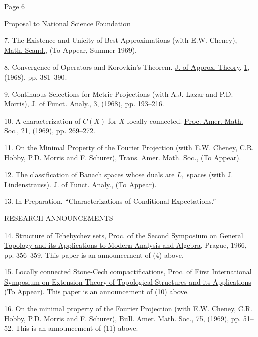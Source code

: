 Page 6

Proposal to National Science Foundation

7. The Existence and Unicity of Best Approximations (with E.W. Cheney),
\uline{Math. Scand.}, (To Appear, Summer 1969).

8. Convergence of Operators and Korovkin’s Theorem.
\uline{J. of Approx. Theory}, \uline{1}, (1968), pp. 381--390.

9. Continuous Selections for Metric Projections (with A.J. Lazar and P.D. Morris),
\uline{J. of Funct. Analy.}, \uline{3}, (1968), pp. 193--216.

10. A characterization of $C(X)$ for $X$ locally connected.
\uline{Proc. Amer. Math. Soc.}, \uline{21}, (1969), pp. 269--272.

11. On the Minimal Property of the Fourier Projection
(with E.W. Cheney, C.R. Hobby, P.D. Morris and F. Schurer),
\uline{Trans. Amer. Math. Soc.}, (To Appear).

12. The classification of Banach spaces whose duals are $L_1$ spaces
(with J. Lindenstrauss). \uline{J. of Funct. Analy.}, (To Appear).

13. In Preparation. ``Characterizations of Conditional Expectations.''

RESEARCH ANNOUNCEMENTS

14. Structure of Tchebychev sets,
\uline{Proc. of the Second Symposium on General Topology and its Applications to Modern Analysis and Algebra},
Prague, 1966, pp. 356--359. This paper is an announcement of (4) above.

15. Locally connected Stone-Cech compactifications,
\uline{Proc. of First International Symposium on Extension Theory of Topological Structures and its Applications}
(To Appear). This paper is an announcement of (10) above.

16. On the minimal property of the Fourier Projection
(with E.W. Cheney, C.R. Hobby, P.D. Morris and F. Schurer),
\uline{Bull. Amer. Math. Soc.}, \uline{75}, (1969), pp. 51--52.
This is an announcement of (11) above.
